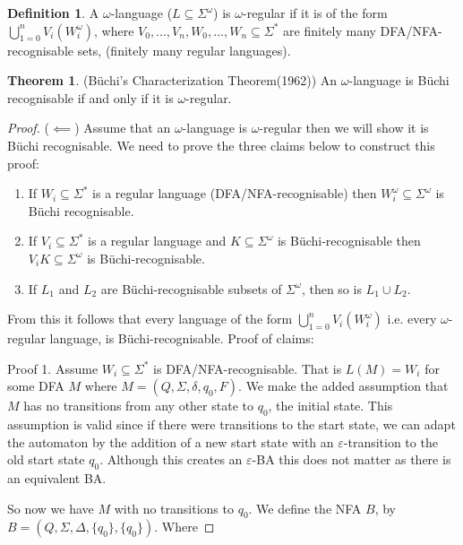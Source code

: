 \documentclass[a4paper,12pt]{report}
\theoremstyle{definition}
\newtheorem{definition}{Definition}[subsection]
\newtheorem{theorem}{Theorem}[chapter]
\begin{document}
\begin{definition}
A $\omega$-language ($L\subseteq \Sigma^\omega$) is $\omega$-regular if it is of the form $\bigcup_{1=0}^{n} V_i(W_i^\omega)$, where $V_0, ..., V_n, W_0, ..., W_n \subseteq \Sigma^*$ are finitely many DFA/NFA-recognisable sets, (finitely many regular languages). 


\end{definition}


\begin{theorem}(Büchi's Characterization Theorem(1962))
An $\omega$-language is Büchi recognisable if and only if it is $\omega$-regular. 


\end{theorem}


\begin{proof}
($\impliedby$) Assume that an $\omega$-language is $\omega$-regular then we will show it is Büchi recognisable. We need to prove the three claims below to construct this proof:
\begin{enumerate}
\item If $W_i\subseteq \Sigma^*$ is a regular language (DFA/NFA-recognisable) then $W_i^\omega\subseteq\Sigma^\omega$ is Büchi recognisable.
\item If $V_i\subseteq \Sigma^*$ is a regular language and $K\subseteq \Sigma^\omega$ is Büchi-recognisable then $V_iK\subseteq \Sigma^\omega$ is Büchi-recognisable. 
\item If $L_1$ and $L_2$ are Büchi-recognisable subsets of $\Sigma^\omega$, then so is $L_1\cup L_2$. 
\end{enumerate}
From this it follows that every language of the form $\bigcup_{1=0}^{n} V_i(W_i^\omega)$ i.e. every  $\omega$-regular language, is Büchi-recognisable. 
Proof of claims:

Proof 1. Assume $W_i\subseteq\Sigma^*$ is DFA/NFA-recognisable. That is $L(M)=W_i$ for some DFA $M$ where $M=(Q,\Sigma, \delta, q_0, F)$. We make the added assumption that $M$ has no transitions from any other state to $q_0$, the initial state. This assumption is valid since if there were transitions to the start state, we can adapt the automaton by the addition of a new start state with an $\varepsilon$-transition to the old start state $q_0$. Although this creates an $\varepsilon$-BA this does not matter as there is an equivalent BA. 

So now we have $M$ with no transitions to $q_0$. We define the NFA $B$, by $B=(Q,\Sigma,\Delta,\{q_0\}, \{q_0\})$. Where 


\end{proof}
\end{document}
